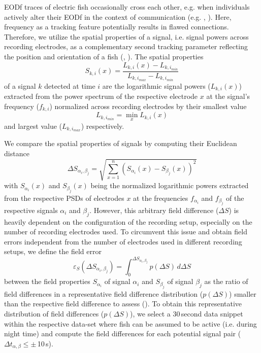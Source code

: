 EODf traces of electric fish occasionally cross each other, e.g. when individuals actively alter their EODf in the context of communication (e.g. \citealp{Zupanc2002, Triefenbach2008, Raab2021}, ). Here, frequency as a tracking feature potentially results in flawed connections. Therefore, we utilize the spatial properties of a signal, i.e. signal powers across recording electrodes, as a complementary second tracking parameter reflecting the position and orientation of a fish (\citealp{Madhav2018}, ). The spatial properties 
\begin{equation}\label{field_properties}
S_{k, i}(x) = \frac{L_{k, i}(x) - L_{k, i_{min}}}{L_{k, i_{max}} - L_{k, i_{min}}}
\end{equation}
of a signal $k$ detected at time $i$ are the logarithmic signal powers ($L_{k, i}(x)$) extracted from the power spectrum of the respective electrode $x$ at the signal's frequency ($f_{k, i}$) normalized across recording electrodes by their smallest value 
\begin{equation}
L_{k, i_{min}} = \min_x L_{k, i}(x)
\end{equation}
and largest value ($L_{k, i_{max}}$) respectively. 

We compare the spatial properties of signals by computing their Euclidean distance 
\begin{equation}\label{field_diff_eq}
  \Delta S_{\alpha_i, \beta_j} = \sqrt{\sum_{x=1}^{n} (S_{\alpha_i}(x) - S_{\beta_j}(x))^2}
\end{equation} 
with $S_{\alpha_i}(x)$ and $S_{\beta_j}(x)$ being the normalized logarithmic powers extracted from the respective PSDs of electrodes $x$ at the frequencies $f_{\alpha_i}$ and $f_{\beta_j}$ of the respective signals  $\alpha_i$ and $\beta_j$. However, this arbitrary field difference ($\Delta S$) is heavily dependent on the configuration of the recording setup, especially on the number of recording electrodes used. To circumvent this issue and obtain field errors independent from the number of electrodes used in different recording setups, we define the field error 
\begin{equation}
\varepsilon_S(\Delta S_{\alpha_i, \beta_j}) = \int_0^{\Delta S_{\alpha_i, \beta_j}} p(\Delta S)\,d\Delta S
\end{equation}
 between the field properties $S_{\alpha_i}$ of signal $\alpha_i$ and $S_{\beta_j}$ of signal $\beta_j$ as the ratio of field differences in a representative field difference distribution ($p(\Delta S)$) smaller than the respective field difference to assess (). To obtain this representative distribution of field differences ($p(\Delta S)$), we select a 30\,second data snippet within the respective data-set where fish can be assumed to be active (i.e. during night time) and compute the field differences for each potential signal pair ($\Delta t_{\alpha, \beta} \leq\pm$\,10\,s). 


